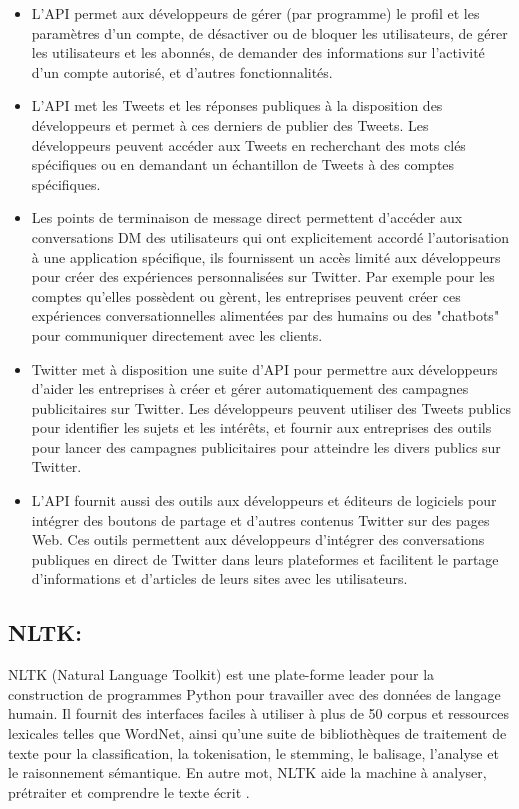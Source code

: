 \begin{itemize}
    \item {} L'API permet aux développeurs de gérer (par programme) le profil et les paramètres d'un compte, de désactiver ou de bloquer les utilisateurs, de gérer les utilisateurs et les abonnés, de demander des informations sur l'activité d'un compte autorisé, et d'autres fonctionnalités.
    \item {} L'API met les Tweets et les réponses publiques à la disposition des développeurs et permet à ces derniers de publier des Tweets. Les développeurs peuvent accéder aux Tweets en recherchant des mots clés spécifiques ou en demandant un échantillon de Tweets à des comptes spécifiques.
    \item {} Les points de terminaison de message direct permettent d'accéder aux conversations DM des utilisateurs qui ont explicitement accordé l'autorisation à une application spécifique, ils fournissent un accès limité aux développeurs pour créer des expériences personnalisées sur Twitter. Par exemple pour les comptes qu'elles possèdent ou gèrent, les entreprises peuvent créer ces expériences conversationnelles alimentées par des humains ou des "chatbots" pour communiquer directement avec les clients.
    \item {} Twitter met à disposition une suite d'API pour permettre aux développeurs d'aider les entreprises à créer et gérer automatiquement des campagnes publicitaires sur Twitter. Les développeurs peuvent utiliser des Tweets publics pour identifier les sujets et les intérêts, et fournir aux entreprises des outils pour lancer des campagnes publicitaires pour atteindre les divers publics sur Twitter.
    \item {} L'API fournit aussi des outils aux développeurs et éditeurs de logiciels pour intégrer des boutons de partage et d'autres contenus Twitter sur des pages Web. Ces outils permettent aux développeurs d'intégrer des conversations publiques en direct de Twitter dans leurs plateformes et facilitent le partage d'informations et d'articles de leurs sites avec les utilisateurs.
\end{itemize}

\subsection{NLTK:}
NLTK (Natural Language Toolkit) est une plate-forme leader pour la construction de programmes Python pour travailler avec des données de langage humain. Il fournit des interfaces faciles à utiliser à plus de 50 corpus et ressources lexicales telles que WordNet, ainsi qu'une suite de bibliothèques de traitement de texte pour la classification, la tokenisation, le stemming, le balisage, l'analyse et le raisonnement sémantique. En autre mot, NLTK aide la machine à analyser, prétraiter et comprendre le texte écrit \cite{bird2009natural}.

